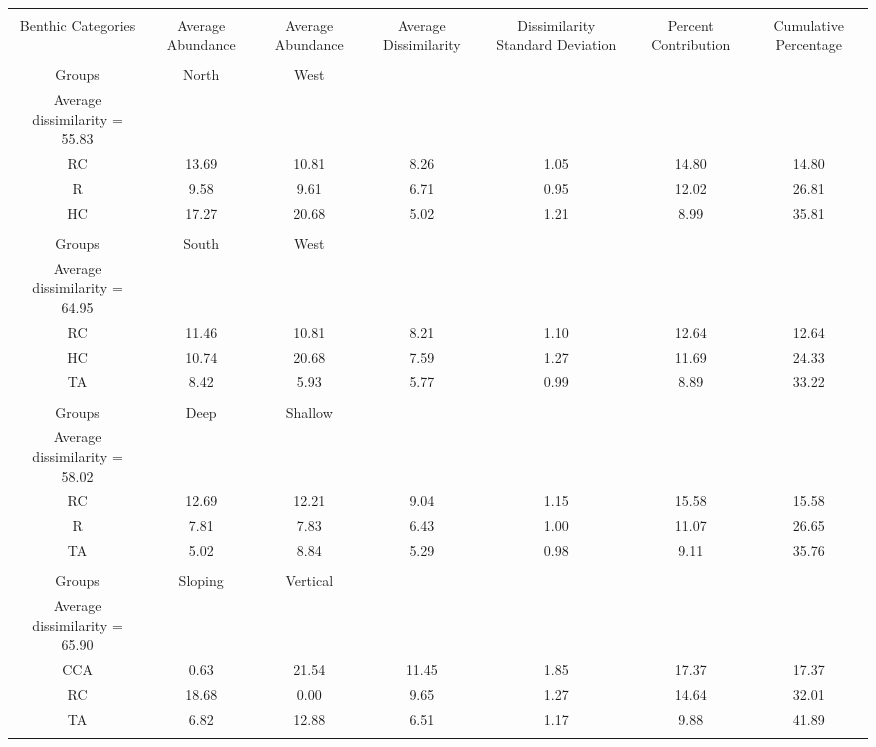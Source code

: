 \documentclass{article}
\begin{document}
\begin{table}[!htbp] \centering 
  \caption*{} 
  \label{} 
\begin{tabular}{@{\extracolsep{5pt}} ccccccc} 
\\[-1.8ex]\hline 
\hline \\[-1.8ex] 
Benthic Categories & Average Abundance	&  Average Abundance & Average Dissimilarity & Dissimilarity Standard Deviation & Percent Contribution & Cumulative Percentage\\
\hline \\[-1.8ex] 
Groups &North  &  West\\
Average dissimilarity = 55.83\\
RC	&      13.69	&     10.81&	   8.26	 &  1.05&	   14.80&	14.80\\
R	  &     9.58	&      9.61	&   6.71	  & 0.95	 &  12.02&	26.81\\
HC	  &    17.27	 &    20.68	&   5.02	&   1.21	&    8.99	&35.81\\
\hline\\[-1.8ex] 
Groups &South  &  West\\
Average dissimilarity = 64.95 \\
RC	&     11.46 &10.81 &8.21	  & 1.10	 &  12.64	&12.64\\
HC	&    10.74 &  20.68	& 7.59	 &  1.27	&   11.69	&24.33\\
TA	&      8.42 & 5.93 & 5.77	&   0.99	&    8.89	&33.22\\
\hline\\[-1.8ex] 
Groups& Deep  &  Shallow\\
Average dissimilarity = 58.02\\
RC	&     12.69	&        12.21	&   9.04	 &  1.15	   &15.58	&15.58\\
R	  &    7.81	   &      7.83	  & 6.43&	   1.00	&   11.07	&26.65\\
TA	    &  5.02	 &        8.84	  & 5.29	&   0.98	  &  9.11&	35.76\\
\hline \\[-1.8ex] 
Groups & Sloping&	Vertical\\
Average dissimilarity = 65.90\\	       	       	        	     
CCA	    &     0.63	    &     21.54	 & 11.45	  & 1.85	&   17.37&	17.37\\
RC	     &   18.68	  &        0.00	  & 9.65	  & 1.27	 &  14.64&	32.01\\
TA	      &   6.82	&         12.88	  & 6.51	 &  1.17	 &   9.88	&41.89\\

\hline \\[-1.8ex] 
\end{tabular} 
\end{table} 
\end{document}

